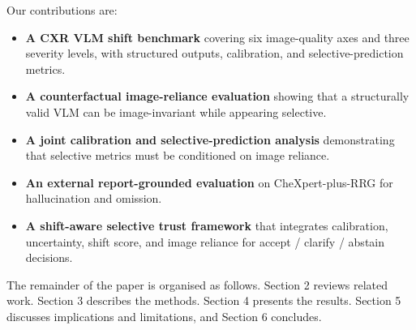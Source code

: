 Our contributions are:

\begin{itemize}
\item \textbf{A CXR VLM shift benchmark} covering six image-quality axes and three severity levels, with structured outputs, calibration, and selective-prediction metrics.
\item \textbf{A counterfactual image-reliance evaluation} showing that a structurally valid VLM can be image-invariant while appearing selective.
\item \textbf{A joint calibration and selective-prediction analysis} demonstrating that selective metrics must be conditioned on image reliance.
\item \textbf{An external report-grounded evaluation} on CheXpert-plus-RRG for hallucination and omission.
\item \textbf{A shift-aware selective trust framework} that integrates calibration, uncertainty, shift score, and image reliance for accept / clarify / abstain decisions.
\end{itemize}

The remainder of the paper is organised as follows. Section 2 reviews related work. Section 3 describes the methods. Section 4 presents the results. Section 5 discusses implications and limitations, and Section 6 concludes.

